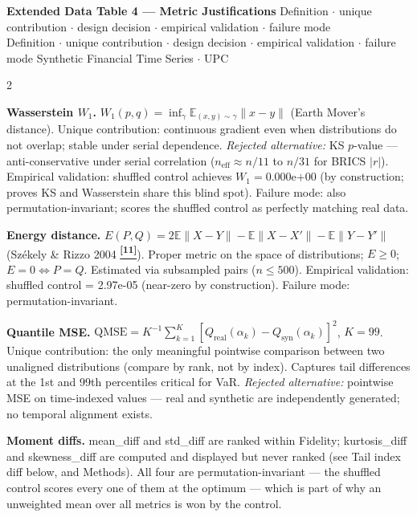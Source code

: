 \documentclass[10pt]{article}
\newcommand{\tealbox}[2]{\begin{tcolorbox}[mybox={Teal}{LBg},title={#1}]#2\end{tcolorbox}}
\newcommand{\purplebox}[2]{\begin{tcolorbox}[mybox={Purple}{LBg},title={#1}]#2\end{tcolorbox}}
\newcommand{\pagehead}[2]{%
  \begin{tcolorbox}[enhanced,arc=0pt,outer arc=0pt,boxrule=0pt,
    colback=Navy,colframe=Navy,
    top=5pt,bottom=5pt,left=8pt,right=8pt,
    before skip=0pt,after skip=10pt]
  {\color{white}\large\bfseries #1}%
  \ifx\relax#2\relax\else\\[1pt]{\color{blue!30!white}\small #2}\fi
  \hfill{\color{blue!20!white}\footnotesize Synthetic Financial Time Series $\cdot$ UPC}
  \end{tcolorbox}}
\newcommand{\tcite}[1]{%
  \hyperlink{R:#1}{\textsuperscript{\scriptsize\textbf{[#1]}}}}
\newcommand{\E}{\mathbb{E}}
\begin{document}
\clearpage

\pagehead{Extended Data Table 4 --- Metric Justifications}
         {Definition $\cdot$ unique contribution $\cdot$ design decision $\cdot$ empirical validation $\cdot$ failure mode}

\begin{multicols}{2}
\small

\tealbox{Fidelity Group: Wasserstein and Energy Distance}{%
\textbf{Wasserstein $W_1$.} $W_1(p,q) = \inf_\gamma \E_{(x,y)\sim\gamma}\|x-y\|$ (Earth Mover's distance). Unique contribution: continuous gradient even when distributions do not overlap; stable under serial dependence. \textit{Rejected alternative:} KS $p$-value --- anti-conservative under serial correlation ($n_\text{eff} \approx n/11$ to $n/31$ for BRICS $|r|$). Empirical validation: shuffled control achieves $W_1 = 0.000\text{e+00}$ (by construction; proves KS and Wasserstein share this blind spot). Failure mode: also permutation-invariant; scores the shuffled control as perfectly matching real data.

\smallskip
\textbf{Energy distance.} $E(P,Q) = 2\E\|X-Y\| - \E\|X-X'\| - \E\|Y-Y'\|$ (Sz\'{e}kely \& Rizzo 2004\tcite{11}). Proper metric on the space of distributions; $E \geq 0$; $E=0 \Leftrightarrow P=Q$. Estimated via subsampled pairs ($n \leq 500$). Empirical validation: shuffled control = 2.97e-05 (near-zero by construction). Failure mode: permutation-invariant.}

\purplebox{Fidelity Group: Quantile MSE and Moment/Tail Diffs}{%
\textbf{Quantile MSE.} $\text{QMSE} = K^{-1}\sum_{k=1}^K [Q_\text{real}(\alpha_k) - Q_\text{syn}(\alpha_k)]^2$, $K=99$. Unique contribution: the only meaningful pointwise comparison between two unaligned distributions (compare by rank, not by index). Captures tail differences at the 1st and 99th percentiles critical for VaR. \textit{Rejected alternative:} pointwise MSE on time-indexed values --- real and synthetic are independently generated; no temporal alignment exists.

\smallskip
\textbf{Moment diffs.} mean\_diff and std\_diff are ranked within Fidelity; kurtosis\_diff and skewness\_diff are computed and displayed but never ranked (see Tail index diff below, and Methods). All four are permutation-invariant --- the shuffled control scores every one of them at the optimum --- which is part of why an unweighted mean over all metrics is won by the control.

}
\end{multicols}
\end{document}
